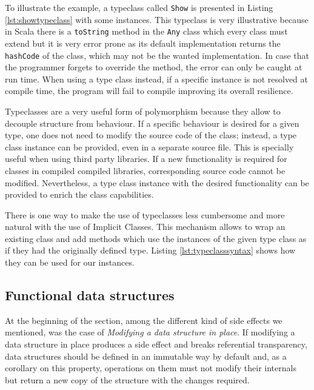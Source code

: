 \documentclass[../main.tex]{subfiles}
\begin{document}
To illustrate the example, a typeclass called \texttt{Show} is presented in
Listing \ref{lst:showtypeclass} with some instances. This typeclass is very
illustrative because in Scala there is a \texttt{toString} method in the
\texttt{Any} class\autocite{ScalaScala.Anyb} which every class must extend but it
is very error prone as its default implementation returns the \texttt{hashCode} of the
class, which may not be the wanted implementation. In case that the programmer
forgets to override the method, the error can only be caught at run time. When
using a type class instead, if a specific instance is not resolved at compile time, the
program will fail to compile improving its overall resilience.



Typeclasses are a very useful form of polymorphism because they allow to decouple structure from
behaviour. If a specific behaviour is desired for a given type, one does not need
to modify the source code of the class; instead, a type class instance can be provided, even
in a separate source file. This is specially useful when using third party
libraries. If a new functionality is required for classes in compiled compiled libraries,
corresponding source code cannot be modified. Nevertheless, a type class instance
with the desired functionality can be provided to enrich the class capabilities.

There is one way to make the use of typeclasses less cumbersome and more natural
with the use of Implicit Classes. This mechanism allows to wrap an existing
class and add methods which use the instances of the given type class as if they
had the originally defined type. Listing \ref{lst:typeclasssyntax}
shows how they can be used for our instances.




\subsection{Functional data structures} At the beginning of the section, among
the different kind of side effects we mentioned, was the case of \textit{Modifying a
data structure in place}. If modifying a data structure in place produces a side
effect and breaks referential transparency, data structures should be defined in an
immutable way by default and, as a corollary on this property, operations on them
must not modify their internals but return a new copy of the structure with the changes required.
\end{document}
